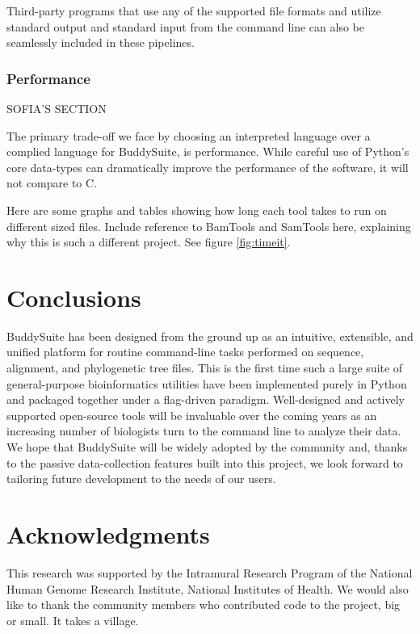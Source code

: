 \documentclass[nogrid]{MBE_article}%
\begin{document}
\smallskip
Third-party programs that use any of the supported file formats and utilize standard output and standard input from the command line can also be seamlessly included in these pipelines.

\subsubsection{Performance}
SOFIA'S SECTION

The primary trade-off we face by choosing an interpreted language over a complied language for BuddySuite, is performance. While careful use of Python's core data-types can dramatically improve the performance of the software, it will not compare to C.

Here are some graphs and tables showing how long each tool takes to run on different sized files. Include reference to BamTools and SamTools here, explaining why this is such a different project. See figure \ref{fig:timeit}.

\section{Conclusions}
BuddySuite has been designed from the ground up as an intuitive, extensible, and unified platform for routine command-line tasks performed on sequence, alignment, and phylogenetic tree files. This is the first time such a large suite of general-purpose bioinformatics utilities have been implemented purely in Python and packaged together under a flag-driven paradigm. Well-designed and actively supported open-source tools will be invaluable over the coming years as an increasing number of biologists turn to the command line to analyze their data. We hope that BuddySuite will be widely adopted by the community and, thanks to the passive data-collection features built into this project, we look forward to tailoring future development to the needs of our users.


\section{Acknowledgments}
This research was supported by the Intramural Research Program of the National Human Genome Research Institute, National Institutes of Health. We would also like to thank the community members who contributed code to the project, big or small. It takes a village.


\end{document}
